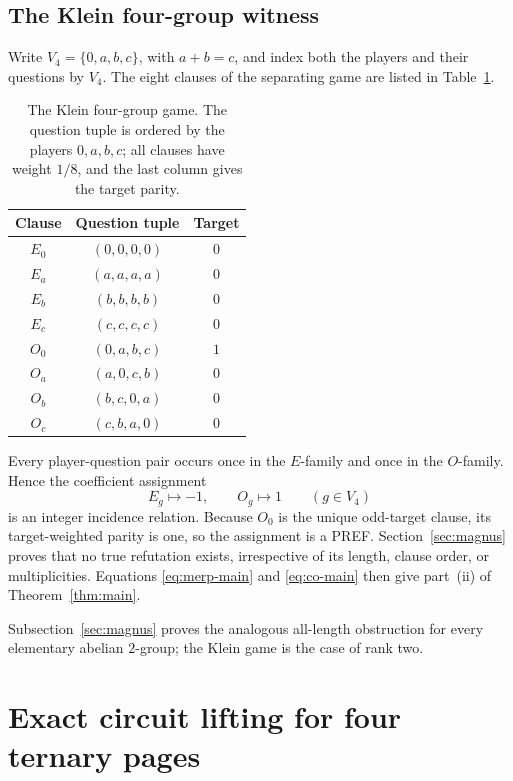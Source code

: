 \documentclass[11pt]{article}
\theoremstyle{definition}
\theoremstyle{remark}
\numberwithin{equation}{section}
\begin{document}
\subsection{The Klein four-group witness}\label{sec:klein-witness}

Write \(V_4=\{0,a,b,c\}\), with \(a+b=c\), and index both the players and
their questions by \(V_4\).  The eight clauses of the separating game are
listed in Table~\ref{tab:klein}.

\begin{table}[htbp]
\centering
\caption{The Klein four-group game.  The question tuple is ordered by the
players \(0,a,b,c\); all clauses have weight \(1/8\), and the last column
gives the target parity.}
\label{tab:klein}
\begin{tabular}{ccc}
\toprule
Clause & Question tuple & Target\\
\midrule
\(E_0\) & \((0,0,0,0)\) & \(0\)\\
\(E_a\) & \((a,a,a,a)\) & \(0\)\\
\(E_b\) & \((b,b,b,b)\) & \(0\)\\
\(E_c\) & \((c,c,c,c)\) & \(0\)\\
\(O_0\) & \((0,a,b,c)\) & \(1\)\\
\(O_a\) & \((a,0,c,b)\) & \(0\)\\
\(O_b\) & \((b,c,0,a)\) & \(0\)\\
\(O_c\) & \((c,b,a,0)\) & \(0\)\\
\bottomrule
\end{tabular}
\end{table}

Every player-question pair occurs once in the \(E\)-family and once in the
\(O\)-family.  Hence the coefficient assignment
\begin{equation}\label{eq:cayley-pref}
  E_g\longmapsto-1,\qquad O_g\longmapsto1\qquad(g\in V_4)
\end{equation}
is an integer incidence relation.  Because \(O_0\) is the unique odd-target
clause, its target-weighted parity is one, so the assignment is a PREF.
Section~\ref{sec:magnus} proves that no true refutation exists, irrespective of its
length, clause order, or multiplicities.  Equations
\eqref{eq:merp-main} and \eqref{eq:co-main} then give part~(ii) of
Theorem~\ref{thm:main}.

Subsection~\ref{sec:magnus} proves the analogous all-length obstruction for
every elementary abelian \(2\)-group; the Klein game is the case of rank two.

\section{Exact circuit lifting for four ternary pages}
\label{sec:sufficiency}
\end{document}
